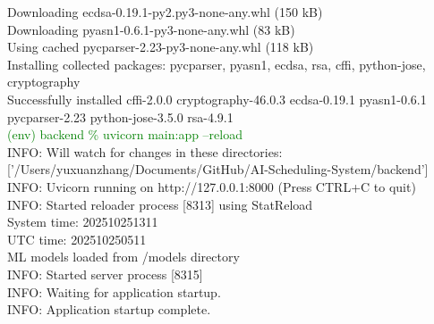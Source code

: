 \documentclass[12pt, a4paper]{article}
\begin{document}
\begin{monoblock}
            Downloading ecdsa-0.19.1-py2.py3-none-any.whl (150 kB) \\
            Downloading pyasn1-0.6.1-py3-none-any.whl (83 kB) \\
            Using cached pycparser-2.23-py3-none-any.whl (118 kB) \\
            Installing collected packages: pycparser, pyasn1, ecdsa, rsa, cffi, python-jose, cryptography \\
            Successfully installed cffi-2.0.0 cryptography-46.0.3 ecdsa-0.19.1 pyasn1-0.6.1 pycparser-2.23 python-jose-3.5.0 rsa-4.9.1 \\
        
            \textcolor{green}{(env) backend \% uvicorn main:app --reload} \\
            
            INFO:     Will watch for changes in these directories: ['/Users/yuxuanzhang/Documents/GitHub/AI-Scheduling-System/backend'] \\
            INFO:     Uvicorn running on http://127.0.0.1:8000 (Press CTRL+C to quit) \\
            INFO:     Started reloader process [8313] using StatReload \\
            System time: 202510251311 \\
            UTC time: 202510250511 \\
            ML models loaded from /models directory \\
            INFO:     Started server process [8315] \\
            INFO:     Waiting for application startup. \\
            INFO:     Application startup complete. \\
        \end{monoblock}
\end{document}
